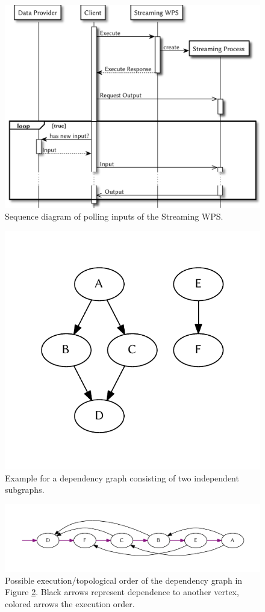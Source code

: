 	\begin{figure}[!htb]
		\centering
		\includegraphics[width=.7868\textwidth]{figures/sequence-diagramm-polling.pdf}
		\caption{\label{fig:sd:polling} Sequence diagram of polling inputs of the Streaming WPS.}
	\end{figure}
	\begin{figure}[!htb]
		\centering
		\includegraphics[width=.4474\textwidth]{figures/unordered-graph.pdf} %
		\caption{\label{fig:graph:unordered} Example for a dependency graph consisting of two independent subgraphs.}
	\end{figure}
	\begin{figure}[!htb]
		\centering
		\includegraphics[width=1\textwidth]{figures/ordered-graph.pdf} %
		\caption{\label{fig:graph:ordered} Possible execution/topological order of the dependency graph in Figure \ref{fig:graph:unordered}. Black arrows represent dependence to another vertex, colored arrows the execution order.}
	\end{figure}

